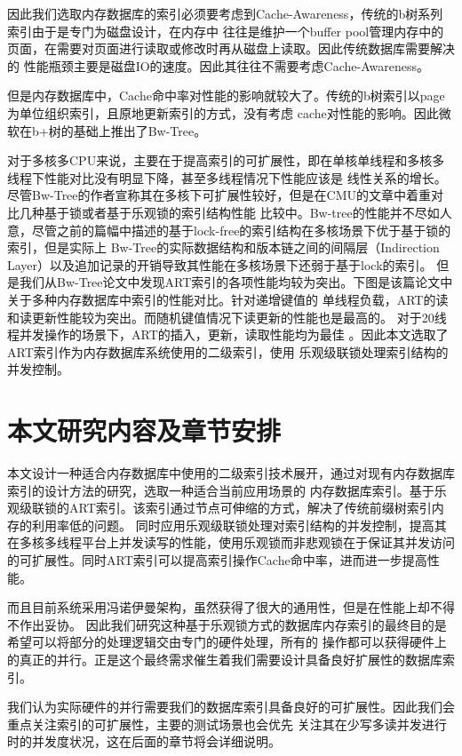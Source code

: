 因此我们选取内存数据库的索引必须要考虑到Cache-Awareness，传统的b树系列索引由于是专门为磁盘设计，在内存中
往往是维护一个buffer pool管理内存中的页面，在需要对页面进行读取或修改时再从磁盘上读取。因此传统数据库需要解决的
性能瓶颈主要是磁盘IO的速度。因此其往往不需要考虑Cache-Awareness。

但是内存数据库中，Cache命中率对性能的影响就较大了。传统的b树索引以page为单位组织索引，且原地更新索引的方式，没有考虑
cache对性能的影响。因此微软在b+树的基础上推出了Bw-Tree。


对于多核多CPU来说，主要在于提高索引的可扩展性，即在单核单线程和多核多线程下性能对比没有明显下降，甚至多线程情况下性能应该是
线性关系的增长。尽管Bw-Tree的作者宣称其在多核下可扩展性较好，但是在CMU的文章中着重对比几种基于锁或者基于乐观锁的索引结构性能
比较中。Bw-tree的性能并不尽如人意，尽管之前的篇幅中描述的基于lock-free的索引结构在多核场景下优于基于锁的索引，但是实际上
Bw-Tree的实际数据结构和版本链之间的间隔层（Indirection Layer）以及追加记录的开销导致其性能在多核场景下还弱于基于lock的索引。
\cite{bottcher2019scalable}
但是我们从Bw-Tree论文中发现ART索引的各项性能均较为突出。下图是该篇论文中关于多种内存数据库中索引的性能对比。针对递增键值的
单线程负载，ART的读和读更新性能较为突出。而随机键值情况下读更新的性能也是最高的。
对于20线程并发操作的场景下，ART的插入，更新，读取性能均为最佳\cite{huang2022opportunities}
\cite{lee2017wort}\cite{wang2018building}。因此本文选取了ART索引作为内存数据库系统使用的二级索引，使用
乐观级联锁处理索引结构的并发控制。

\section{本文研究内容及章节安排}

本文设计一种适合内存数据库中使用的二级索引技术展开，通过对现有内存数据库索引的设计方法的研究，选取一种适合当前应用场景的
内存数据库索引。基于乐观级联锁的ART索引。该索引通过节点可伸缩的方式，解决了传统前缀树索引内存的利用率低的问题。
同时应用乐观级联锁处理对索引结构的并发控制，提高其在多核多线程平台上并发读写的性能，使用乐观锁而非悲观锁在于保证其并发访问
的可扩展性。同时ART索引可以提高索引操作Cache命中率，进而进一步提高性能。

而且目前系统采用冯诺伊曼架构，虽然获得了很大的通用性，但是在性能上却不得不作出妥协。
因此我们研究这种基于乐观锁方式的数据库内存索引的最终目的是希望可以将部分的处理逻辑交由专门的硬件处理，所有的
操作都可以获得硬件上的真正的并行。正是这个最终需求催生着我们需要设计具备良好扩展性的数据库索引。

我们认为实际硬件的并行需要我们的数据库索引具备良好的可扩展性。因此我们会重点关注索引的可扩展性，主要的测试场景也会优先
关注其在少写多读并发进行时的并发度状况，这在后面的章节将会详细说明。

